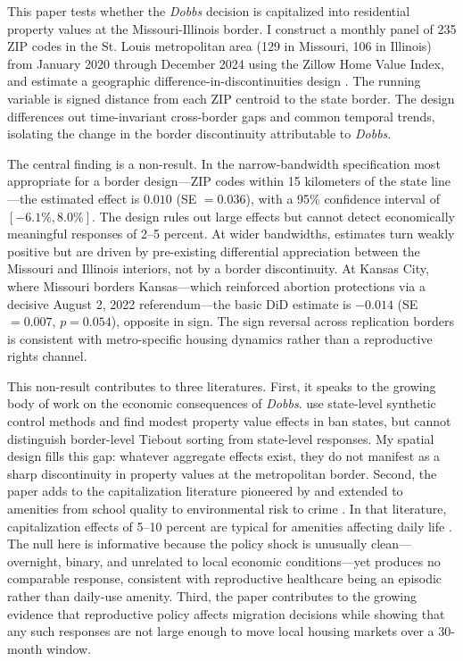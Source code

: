 \documentclass[12pt]{article}
\begin{document}
This paper tests whether the \textit{Dobbs} decision is capitalized into residential property values at the Missouri-Illinois border. I construct a monthly panel of 235 ZIP codes in the St. Louis metropolitan area (129 in Missouri, 106 in Illinois) from January 2020 through December 2024 using the Zillow Home Value Index, and estimate a geographic difference-in-discontinuities design \citep{grembi2016fiscal}. The running variable is signed distance from each ZIP centroid to the state border. The design differences out time-invariant cross-border gaps and common temporal trends, isolating the change in the border discontinuity attributable to \textit{Dobbs}.

The central finding is a non-result. In the narrow-bandwidth specification most appropriate for a border design---ZIP codes within 15 kilometers of the state line---the estimated effect is $0.010$ (SE $= 0.036$), with a 95\% confidence interval of $[-6.1\%, 8.0\%]$. The design rules out large effects but cannot detect economically meaningful responses of 2--5 percent. At wider bandwidths, estimates turn weakly positive but are driven by pre-existing differential appreciation between the Missouri and Illinois interiors, not by a border discontinuity. At Kansas City, where Missouri borders Kansas---which reinforced abortion protections via a decisive August 2, 2022 referendum---the basic DiD estimate is $-0.014$ (SE $= 0.007$, $p = 0.054$), opposite in sign. The sign reversal across replication borders is consistent with metro-specific housing dynamics rather than a reproductive rights channel.

This non-result contributes to three literatures. First, it speaks to the growing body of work on the economic consequences of \textit{Dobbs}. \citet{dench2025dobbs} use state-level synthetic control methods and find modest property value effects in ban states, but cannot distinguish border-level Tiebout sorting from state-level responses. My spatial design fills this gap: whatever aggregate effects exist, they do not manifest as a sharp discontinuity in property values at the metropolitan border. Second, the paper adds to the capitalization literature pioneered by \citet{oates1969effects} and extended to amenities from school quality \citep{black1999better} to environmental risk \citep{davis2011effect} to crime \citep{linden2008estimates}. In that literature, capitalization effects of 5--10 percent are typical for amenities affecting daily life \citep{chay2005does,cellini2010value}. The null here is informative because the policy shock is unusually clean---overnight, binary, and unrelated to local economic conditions---yet produces no comparable response, consistent with reproductive healthcare being an episodic rather than daily-use amenity. Third, the paper contributes to the growing evidence that reproductive policy affects migration decisions \citep{jones2022migration,kearney2023dobbs} while showing that any such responses are not large enough to move local housing markets over a 30-month window.
\end{document}
